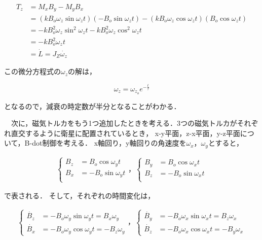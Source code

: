 \begin{equation}
    \begin{aligned}
        T_z &= M_xB_y - M_yB_x\\
            &= (kB_o\omega_z\sin\omega_zt)(-B_o\sin\omega_zt)-(kB_o\omega_z\cos\omega_zt)(B_o\cos\omega_zt)\\
            &= -kB_o^2\omega_z\sin^2\omega_zt - kB_o^2\omega_z\cos^2\omega_zt\\
            &= -kB_o^2\omega_zt\\
            &= \dot{L} = J_Z\dot{\omega_z}
    \end{aligned}
\end{equation}

この微分方程式の$\omega_z$の解は，

\begin{equation}
    \omega_z = \omega_{z_o}e^{-\frac{t}{\tau}} 
\end{equation}

となるので，減衰の時定数が半分となることがわかる．


　次に，磁気トルカをもう1つ追加したときを考える．3つの磁気トルカがそれぞれ直交するように衛星に配置されているとき，
x-y平面，z-x平面，y-z平面について，B-dot制御を考える．
x軸回り，y軸回りの角速度を$\omega_x$，$\omega_y$とすると，

\begin{align}
    \left\{
        \begin{aligned}
            B_z &= B_o\cos\omega_yt\\
            B_x &= -B_o\sin\omega_yt\\
        \end{aligned}                    
    \right.
    ，
    \left\{
        \begin{aligned}
            B_y &= B_o\cos\omega_xt\\
            B_z &= -B_o\sin\omega_xt\\
        \end{aligned}                    
    \right.
\end{align}

で表される．
そして，それぞれの時間変化は，

\begin{align}
    \left\{
        \begin{aligned}
            \dot{B_z} &= -B_o\omega_y\sin\omega_yt = B_x\omega_y\\
            \dot{B_x} &= -B_o\omega_y\cos\omega_yt = -B_z\omega_y
        \end{aligned}                    
    \right.
    ，
    \left\{
        \begin{aligned}
            \dot{B_y} &= -B_o\omega_x\sin\omega_xt = B_z\omega_x\\
            \dot{B_z} &= -B_o\omega_x\cos\omega_xt = -B_y\omega_x
        \end{aligned}                    
    \right.
\end{align}

